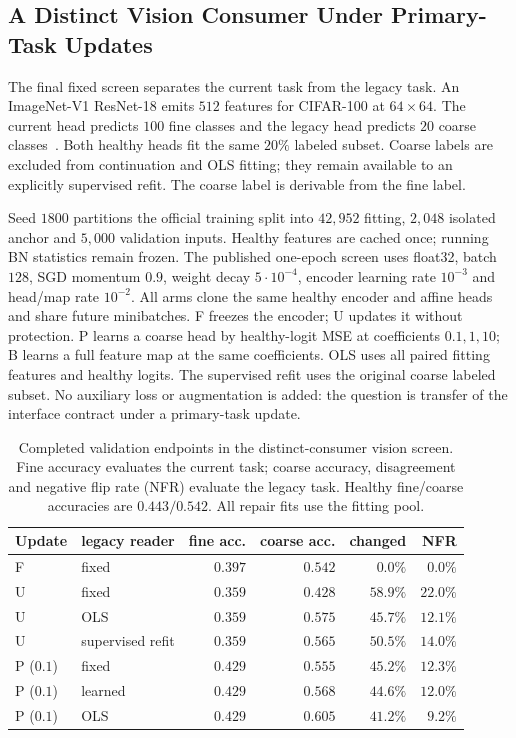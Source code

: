 \subsection{A Distinct Vision Consumer Under Primary-Task Updates}\label{app:vision_consumer}

The final fixed screen separates the current task from the legacy task.
An ImageNet-V1 ResNet-18 emits $512$ features for CIFAR-100 at $64\times64$.
The current head predicts $100$ fine classes and the legacy head predicts
$20$ coarse classes~\citep{krizhevsky2009cifar}. Both healthy heads fit the same
$20\%$ labeled subset. Coarse labels are excluded from continuation and OLS
fitting; they remain available to an explicitly supervised refit. The coarse label is derivable from the fine label.

Seed $1800$ partitions the official training split into $42{,}952$ fitting,
$2{,}048$ isolated anchor and $5{,}000$ validation inputs. Healthy features are
cached once; running BN statistics remain frozen. The published one-epoch
screen uses float32, batch $128$, SGD momentum $0.9$, weight decay
$5\cdot10^{-4}$, encoder learning rate $10^{-3}$ and head/map rate $10^{-2}$.
All arms clone the same healthy encoder and affine heads and share future
minibatches. F freezes the encoder; U updates it without protection. P learns
a coarse head by healthy-logit MSE at coefficients $0.1,1,10$; B learns a full
feature map at the same coefficients. OLS uses all paired fitting features
and healthy logits. The supervised refit uses the original coarse labeled
subset. No auxiliary loss or augmentation is added: the question is transfer
of the interface contract under a primary-task update.

\begin{table}[htbp]
\centering
\caption{Completed validation endpoints in the distinct-consumer vision
screen. Fine accuracy evaluates the current task; coarse accuracy, disagreement
and negative flip rate (NFR) evaluate the legacy task. Healthy fine/coarse
accuracies are $0.443/0.542$. All repair fits use the fitting pool.}
\label{tab:vision_consumer}
\footnotesize
\begin{tabular}{llrrrr}
\toprule
Update & legacy reader & fine acc. & coarse acc. & changed & NFR \\
\midrule
F & fixed & $0.397$ & $0.542$ & $0.0\%$ & $0.0\%$ \\
U & fixed & $0.359$ & $0.428$ & $58.9\%$ & $22.0\%$ \\
U & OLS & $0.359$ & $0.575$ & $45.7\%$ & $12.1\%$ \\
U & supervised refit & $0.359$ & $0.565$ & $50.5\%$ & $14.0\%$ \\
P ($0.1$) & fixed & $0.429$ & $0.555$ & $45.2\%$ & $12.3\%$ \\
P ($0.1$) & learned & $0.429$ & $0.568$ & $44.6\%$ & $12.0\%$ \\
P ($0.1$) & OLS & $0.429$ & $0.605$ & $41.2\%$ & $9.2\%$ \\
\bottomrule
\end{tabular}
\end{table}

